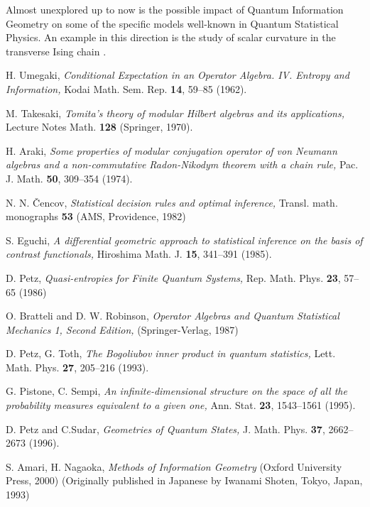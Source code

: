 \documentclass[a4paper,10pt]{article}
\begin{document}
Almost unexplored up to now is the possible impact of Quantum Information Geometry on
some of the specific models well-known in Quantum Statistical Physics.
An example in this direction is the study of scalar curvature in the transverse Ising chain \cite {NT23}.


\begin{thebibliography}{99}


H. Umegaki, {\em
Conditional Expectation in an Operator Algebra.  {IV}. {E}ntropy and Information,}
Kodai Math. Sem. Rep. {\bf 14}, 59--85 (1962).

M. Takesaki, {\em 
Tomita's theory of modular Hilbert algebras and its applications,}
Lecture Notes Math. {\bf 128} (Springer, 1970).

H. Araki, {\em
Some properties of modular conjugation operator of von Neumann
algebras and a non-commutative Radon-Nikodym theorem with a chain rule,}
Pac. J.  Math. {\bf 50}, 309--354 (1974).

N. N. {\v C}encov, {\em
Statistical decision rules and optimal inference,}
Transl. math. monographs {\bf 53} (AMS, Providence, 1982)

 S. Eguchi, {\em 
A differential geometric approach to statistical inference on the basis of contrast functionals,}
Hiroshima Math. J. {\bf 15}, 341--391 (1985). 

D. Petz, {\em 
Quasi-entropies for Finite Quantum Systems,}
Rep. Math. Phys. {\bf 23}, 57--65 (1986)

O. Bratteli and D. W. Robinson, {\em 
Operator Algebras and Quantum Statistical Mechanics 1, Second Edition,}
(Springer-Verlag, 1987)

D. Petz, G. Toth, {\em
The Bogoliubov inner product in quantum statistics,}
Lett. Math. Phys. {\bf 27}, 205--216 (1993).

G. Pistone, C. Sempi, {\em
An infinite-dimensional structure on the space of all 
the probability measures equivalent to a given one,}
Ann. Stat. {\bf 23}, 1543--1561 (1995).

D. Petz and C.Sudar, {\em 
Geometries of Quantum States,}
J. Math. Phys. {\bf 37}, 2662--2673 (1996).

S. Amari, H. Nagaoka, {\em
Methods of Information Geometry}
(Oxford University Press, 2000)
(Originally published in Japanese by Iwanami Shoten, Tokyo, Japan, 1993) 


\end{thebibliography}
\end{document}
